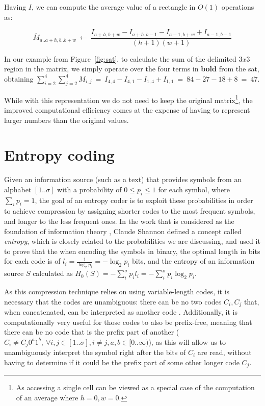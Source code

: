 \documentclass[a4paper,10pt,twoside]{book}
\begin{document}
    Having $I$, we can compute the average value of a rectangle in $O(1)$ operations as:
    
    \[
    \overline{M}_{a..a+h,b..b+w}~\leftarrow~
    \frac{I_{a+h,b+w} - I_{a+h,b-1} - I_{a-1,b+w} + I_{a-1,b-1}}
    {(h+1)(w+1)}
    \]
    
    In our example from Figure~\ref{fig:sat}, to calculate the sum of the delimited $3x3$ region in the matrix, we simply operate over the four terms in \textbf{bold} from the \gls{sat}, obtaining
    $\displaystyle\sum^4_{i=2}\displaystyle\sum^4_{j=2}M_{i,j}~=~I_{4,4}-I_{4,1}-I_{1,4}+I_{1,1}~=~84-27-18+8~=~47$.
    
    While with this representation we do not need to keep the original matrix\footnote{As accessing a single cell can be viewed as a special case of the computation of an average where $h=0,w=0$.}, the improved computational efficiency comes at the expense of having to represent larger numbers than the original values.
	
	\section{Entropy coding}
	Given an information source (such as a text) that provides symbols from an alphabet $[1..\sigma]$ with a probability of $0 \leq p_i \leq 1$ for each symbol, where $\displaystyle\sum_ip_i=1$, the goal of an entropy coder is to exploit these probabilities in order to achieve compression by assigning shorter codes to the most frequent symbols, and longer to the less frequent ones. In the work that is considered as the foundation of information theory \cite{shannon1948mathematical}, Claude Shannon defined a concept called \textit{entropy}, which is closely related to the probabilities we are discussing, and used it to prove that the when encoding the symbols in binary, the optimal length in bits for each code is of $l_i = \frac{1}{\log_2p_i} = -\log_2p_i$ bits, and the entropy of an information source $S$ calculated as $H_0(S) = -\displaystyle\sum^\sigma_i p_il_i = -\displaystyle\sum^\sigma_i p_i\log_2p_i$.
	
	As this compression technique relies on using variable-length codes, it is necessary that the codes are unambiguous: there can be no two codes $C_i, C_j$ that, when concatenated, can be interpreted as another code 
	. Additionally, it is computationally very useful for those codes to also be prefix-free, meaning that there can be no code that is the prefix part of another ($C_i \neq C_j0^a1^b,~\forall i,j \in [1..\sigma], i\neq j, a,b \in [0..\infty)$), as this will allow us to unambiguously interpret the symbol right after the bits of $C_i$ are read, without having to determine if it could be the prefix part of some other longer code $C_j$.
	
\end{document}
